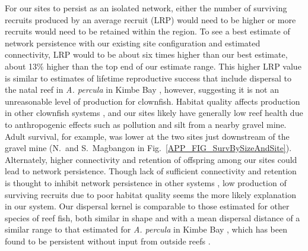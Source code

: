 \documentclass[12pt, oneside]{article}   	%
\begin{document}
For our sites to persist as an isolated network, either the number of surviving recruits produced by an average recruit (LRP) would need to be higher or more recruits would need to be retained within the region. To see a best estimate of network persistence with our existing site configuration and estimated connectivity, LRP would to be about six times higher than our best estimate, about 13\% higher than the top end of our estimate range. This higher LRP value is similar to estimates of lifetime reproductive success that include dispersal to the natal reef in \textit{A. percula} in Kimbe Bay \citep{salles2020strong}, however, suggesting it is not an unreasonable level of production for clownfish. Habitat quality affects production in other clownfish systems \citep[e.g.,][]{salles2020strong, hayashi2019low}, and our sites likely have generally low reef health due to anthropogenic effects such as pollution and silt from a nearby gravel mine. Adult survival, for example, was lower at the two sites just downstream of the gravel mine (N.\ and S.\ Magbangon in Fig.\ \ref{APP_FIG_SurvBySizeAndSite}). Alternately, higher connectivity and retention of offspring among our sites could lead to network persistence. Though lack of sufficient connectivity and retention is thought to inhibit network persistence in other systems \citep[e.g., a collection of reserves for eastern oysters (\textit{Crassostrea virginica}) in the Pamlico Sound in North Carolina;][]{puckett2016metapopulation}, low production of surviving recruits due to poor habitat quality seems the more likely explanation in our system. Our dispersal kernel is comparable to those estimated for other species of reef fish, both similar in shape \citep[e.g.,][]{harrison2012larval, daloia2015patterns} and with a mean dispersal distance of a similar range to that estimated for \textit{A. percula} in Kimbe Bay \citep[13.3 and 18.9 km compared to our estimate of 8.2 km;][]{almany2017larval}, which has been found to be persistent without input from outside reefs \citep{salles_coral_2015}. 
\end{document}

